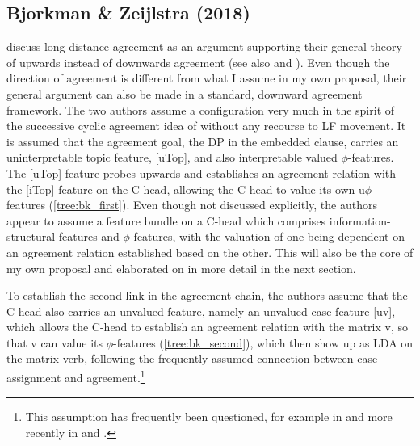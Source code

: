 \documentclass[output=paper
,modfonts
,nonflat]{langsci/langscibook}
\begin{document}
\subsection{Bjorkman \& Zeijlstra (2018)}

\citet{Bjorkman_Zeijlstra2014} discuss long distance agreement as an argument supporting their general theory of upwards instead of downwards agreement (see also \citealt{Baker2008a} and \citealt{Wurmbrand2012c,Wurmbrand2016a,Wurmbrand2016b}). Even though the direction of agreement is different from what I assume in my own proposal, their general argument can also be made in a standard, downward agreement framework. The two authors assume a configuration very much in the spirit of the successive cyclic agreement idea of \citet{Legate2005} without any recourse to LF movement. It is assumed that the agreement goal, the DP in the embedded clause, carries an uninterpretable topic feature, [uTop], and also interpretable valued $ \phi $-features. The [uTop] feature probes upwards and establishes an agreement relation with the [iTop] feature on the C head, allowing the C head to value its own u$ \phi $-features (\ref{tree:bk_first}). Even though not discussed explicitly, the authors appear to assume a feature bundle on a C-head which comprises information-structural features and $ \phi $-features, with the valuation of one being dependent on an agreement relation established based on the other. This will also be the core of my own proposal and elaborated on in more detail in the next section.

To establish the second link in the agreement chain, the authors assume that the C head also carries an unvalued feature, namely an unvalued case feature [uv], which allows the C-head to establish an agreement relation with the matrix v, so that v can value its $ \phi $-features (\ref{tree:bk_second}), which then show up as LDA on the matrix verb, following the frequently assumed connection between case assignment and agreement.\footnote{This assumption has frequently been questioned, for example in \citet{Bobaljik2008} and more recently in \citet{Baker_Bobaljik2015} and \cite{Barany2015}.}
\end{document}
